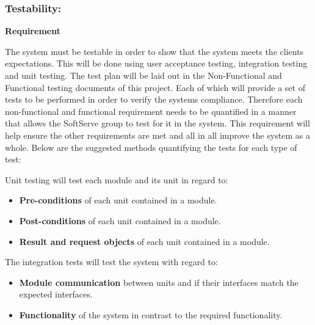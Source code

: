 \subsubsection{Testability:}

\begin{flushleft}
\vspace{0.1in}

\textbf{Requirement}

The system must be testable in order to show that the system meets the clients expectations. This will be done using user acceptance testing, integration testing and unit testing. The test plan will be laid out in the Non-Functional and Functional testing documents of this project. Each of which will provide a set of tests to be performed in order to verify the systems compliance. Therefore each non-functional and functional requirement needs to be quantified in a manner that allows the SoftServe group to test for it in the system. This requirement will help ensure the other requirements are met and all in all improve the system as a whole. Below are the suggested methods quantifying the tests for each type of test:\\


\vspace{0.1in}

Unit testing will test each module and its unit in regard to:
\begin{itemize}

\item\textbf{Pre-conditions} of each unit contained in a module.
\item\textbf{Post-conditions} of each unit contained in a module.
\item\textbf{Result and request objects} of each unit contained in a module.

\end{itemize}

The integration tests will test the system with regard to:

\begin{itemize}

\item \textbf{Module communication} between units and if their interfaces match the expected interfaces. 
\item \textbf{Functionality} of the system in contrast to the required functionality.


\end{itemize}
\end{flushleft}
